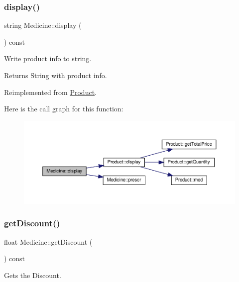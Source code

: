 \subsubsection{\texorpdfstring{display()}{display()}}
{\footnotesize\ttfamily string Medicine\+::display (\begin{DoxyParamCaption}{ }\end{DoxyParamCaption}) const\hspace{0.3cm}{\ttfamily [virtual]}}



Write product info to string. 

\begin{DoxyReturn}{Returns}
String with product info. 
\end{DoxyReturn}


Reimplemented from \hyperlink{classProduct_a2f411b12652a6b7b6194fcdbab3a1fb3}{Product}.

Here is the call graph for this function\+:\nopagebreak
\begin{figure}[H]
\begin{center}
\leavevmode
\includegraphics[width=350pt]{classMedicine_a42cabfcd2dd5f04b10e5a01d86f5ee60_cgraph}
\end{center}
\end{figure}
\mbox{\label{classMedicine_aae7277cc1a23171b2d60225d0e11f24d}} 
\subsubsection{\texorpdfstring{get\+Discount()}{getDiscount()}}
{\footnotesize\ttfamily float Medicine\+::get\+Discount (\begin{DoxyParamCaption}{ }\end{DoxyParamCaption}) const}



Gets the Discount. 

